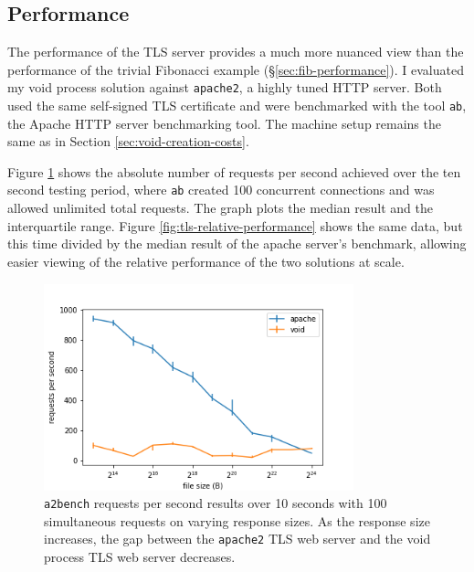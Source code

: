 \documentclass[12pt,a4paper,twoside]{report}
\begin{document}
\subsection{Performance}
\label{sec:tls-performance}

The performance of the TLS server provides a much more nuanced view than the performance of the trivial Fibonacci example (§\ref{sec:fib-performance}). I evaluated my void process solution against \texttt{apache2}, a highly tuned HTTP server. Both used the same self-signed TLS certificate and were benchmarked with the tool \texttt{ab}, the Apache HTTP server benchmarking tool. The machine setup remains the same as in Section \ref{sec:void-creation-costs}.

Figure \ref{fig:tls-performance} shows the absolute number of requests per second achieved over the ten second testing period, where \texttt{ab} created 100 concurrent connections and was allowed unlimited total requests. The graph plots the median result and the interquartile range. Figure \ref{fig:tls-relative-performance} shows the same data, but this time divided by the median result of the apache server's benchmark, allowing easier viewing of the relative performance of the two solutions at scale.

\begin{figure}
    \centering
    \includegraphics[width=0.8\textwidth]{graphs/tls_performance.png}

    \caption{\texttt{a2bench} requests per second results over 10 seconds with 100 simultaneous requests on varying response sizes. As the response size increases, the gap between the \texttt{apache2} TLS web server and the void process TLS web server decreases.}
    \label{fig:tls-performance}
\end{figure}
\end{document}
